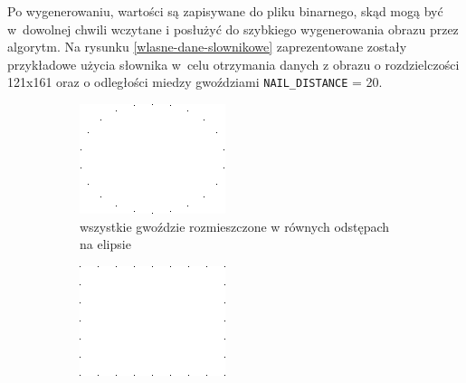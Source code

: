    Po wygenerowaniu, wartości są zapisywane do pliku binarnego, skąd mogą być w~dowolnej chwili wczytane i posłużyć do szybkiego wygenerowania obrazu przez algorytm. Na rysunku \ref{wlasne-dane-slownikowe} zaprezentowane zostały przykładowe użycia słownika w~celu otrzymania danych z obrazu o rozdzielczości 121x161 oraz o odległości miedzy gwoździami \texttt{NAIL_DISTANCE} = 20.
    \begin{figure}[htb] 
    \centering
    \begin{subfigure}{0.49\textwidth}
        \centering
        \includegraphics[width = \textwidth]{img/4-mine/nails-on-elipse.png}
        \caption{wszystkie gwoździe rozmieszczone w równych odstępach na elipsie}
        \label{wlasne-dane-slownikowe-1}
    \end{subfigure}
    \begin{subfigure}{0.49\textwidth}
        \centering
        \includegraphics[width = \textwidth]{img/4-mine/nails-on-rectangle.png}

\end{subfigure}
\end{figure}
